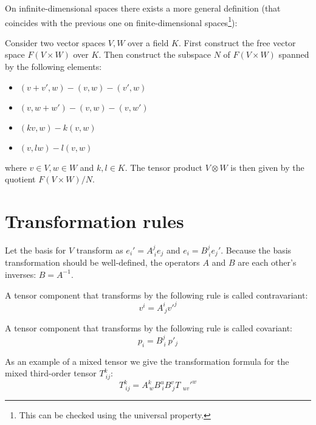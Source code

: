 	On infinite-dimensional spaces there exists a more general definition (that coincides with the previous one on finite-dimensional spaces\footnote{This can be checked using the universal property.}):
	\begin{construct}
		Consider two vector spaces $V, W$ over a field $K$. First construct the free vector space $F(V\times W)$ over $K$. Then construct the subspace $N$ of $F(V\times W)$ spanned by the following elements:
		\begin{itemize}
			\item $(v+v', w) - (v, w) - (v', w)$
			\item $(v, w+w') - (v, w) - (v, w')$
			\item $(kv, w) - k(v, w)$
			\item $(v, lw) - l(v, w)$
		\end{itemize}
		where $v\in V, w\in W$ and  $k,l\in K$. The tensor product $V\otimes W$ is then given by the quotient $F(V\times W)/N$.
	\end{construct}

\section{Transformation rules}

	Let the basis for $V$ transform as $e_i' = A^j_{\ i}e_j$ and $e_i = B^j_{\ i}e_j'$. Because the basis transformation should be well-defined, the operators $A$ and $B$ are each other's inverses: $B = A^{-1}$.

	\begin{definition}[Contravariant]
		A tensor component that transforms by the following rule is called contravariant:
	        \begin{equation}
			\label{tensorcalculus:contravariant}
		        v^i = A^i_{\ j}v'^j
		\end{equation}
	\end{definition}
    
	\begin{definition}[Covariant]
		A tensor component that transforms by the following rule is called covariant:
	        \begin{equation}
			\label{tensorcalculus:covariant}
		        p_i = B^j_{\ i}\ p'_j
		\end{equation}
	\end{definition}
    
	\begin{example}
		As an example of a mixed tensor we give the transformation formula for the mixed third-order tensor $T_{\ ij}^k$:
	        \[
	        	T_{\ ij}^k = A^k_{\ w}B^u_{\ i}B^v_{\ j}T_{\ \ uv}'^w
	        \]
	\end{example}

